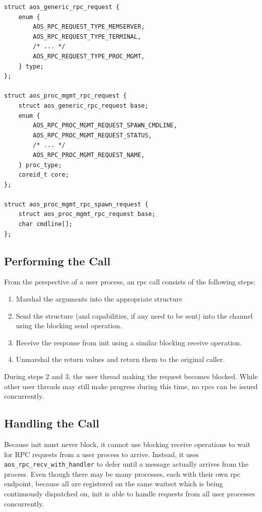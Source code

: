 \begin{lstlisting}[caption={A hierarchy of request types},label={listing:rpcstruct}]
struct aos_generic_rpc_request {
    enum {
        AOS_RPC_REQUEST_TYPE_MEMSERVER,
        AOS_RPC_REQUEST_TYPE_TERMINAL,
        /* ... */
        AOS_RPC_REQUEST_TYPE_PROC_MGMT,
    } type;
};

struct aos_proc_mgmt_rpc_request {
    struct aos_generic_rpc_request base;
    enum {
        AOS_RPC_PROC_MGMT_REQUEST_SPAWN_CMDLINE,
        AOS_RPC_PROC_MGMT_REQUEST_STATUS,
        /* ... */
        AOS_RPC_PROC_MGMT_REQUEST_NAME,
    } proc_type;
    coreid_t core;
};

struct aos_proc_mgmt_rpc_spawn_request {
    struct aos_proc_mgmt_rpc_request base;
    char cmdline[];
};
\end{lstlisting}

\subsection{Performing the Call}
From the perspective of a user process, an rpc call consists of the following steps:
\begin{enumerate}
    \item Marshal the arguments into the appropriate structure
    \item Send the structure (and capabilities, if any need to be sent) into the channel using the blocking send operation.
    \item Receive the response from init using a similar blocking receive operation.
    \item Unmarshal the return values and return them to the original caller.
\end{enumerate}
During steps 2 and 3, the user thread making the request becomes blocked. While other user threads may still make progress during this time, no rpcs can be issued concurrently.

\subsection{Handling the Call}
Because init must never block, it cannot use blocking receive operations to wait for RPC requests from a user process to arrive. Instead, it uses \texttt{aos\_rpc\_recv\_with\_handler} to defer until a message actually arrives from the process. Even though there may be many processes, each with their own rpc endpoint, because all are registered on the same waitset which is being continuously dispatched on, init is able to handle requests from all user processes concurrently.

